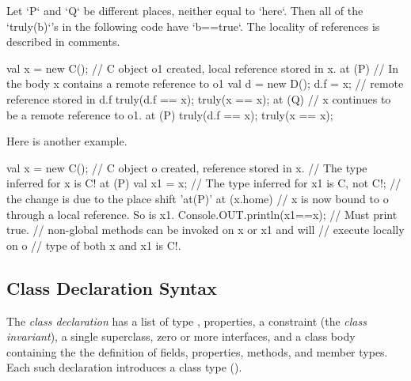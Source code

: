 Let \xcd`P` and \xcd`Q` be different places, neither equal to \xcd`here`.
Then all of the \xcd`truly(b)`'s in the following code have \xcd`b==true`.
The locality of references is described in comments.
\begin{xten}

val x = new C(); 
// C object o1 created, local reference stored in x. 
at (P) { 
      // In the body x contains a remote reference to o1
      val d = new D();
      d.f  = x; // remote reference stored in d.f
      truly(d.f == x);        
      truly(x == x);          
      at (Q) { 
         // x continues to be a remote reference to o1.
         at (P) {  
             truly(d.f == x); 
             truly(x == x);   
         }
      }
}
\end{xten}
  
Here is another example.
\begin{xten}
val x = new C(); 
// C object o created, reference stored in x. 
// The type inferred for x is C!
at (P) { 
    val x1 = x; 
    // The type inferred for x1 is C, not C!;
    // the change is due to the place shift 'at(P)'
  at (x.home) {
        // x is now bound to o through a local reference. So is x1.
    Console.OUT.println(x1==x); // Must print true.
      // non-global methods can be invoked on x or x1 and will 
      // execute locally on o
      // type of both x and x1 is C!.
  }
}
\end{xten}
 
\subsection{Class Declaration Syntax}

The {\em class declaration} has a list of type \params, properties, a
constraint (the {\em class invariant}), a single superclass, zero or more
interfaces, and a class body containing the the definition of fields,
properties, methods, and member types. Each such declaration introduces a
class type ().

